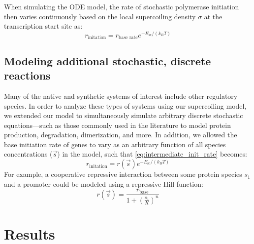 \documentclass[11pt]{article}
\begin{document}
When simulating the ODE model, the rate of stochastic polymerase initiation then varies continuously based on the local supercoiling density \(\sigma\) at the transcription start site as:
\begin{equation}
    r_\text{initation} = r_\text{base rate} e^{- E_\text{sc} / (k_B T)}
\label{eq:intermediate_init_rate}
\end{equation}


\subsection{Modeling additional stochastic, discrete reactions}
Many of the native and synthetic systems of interest include other regulatory species. In order to analyze these types of systems using our supercoiling model, we extended our model to simultaneously simulate arbitrary discrete stochastic equations---such as those commonly used in the literature to model protein production, degradation, dimerization, and more.
In addition, we allowed the base initiation rate of genes to vary as an arbitrary function of all species concentrations (\(\vec s\)) in the model, such that \cref{eq:intermediate_init_rate} becomes:
\begin{equation}
    r_\text{initation} = r(\vec s) e^{- E_\text{sc} / (k_B T)}
\label{eq:final_init_rate}
\end{equation}
For example, a cooperative repressive interaction between some protein species \(s_1\) and a promoter could be modeled using a repressive Hill function:
\[
    r(\vec s) = \frac{r_\text{base}}{1 + \left(\frac{s_1}{K}\right)^n}
\]


\section{Results}
\end{document}
